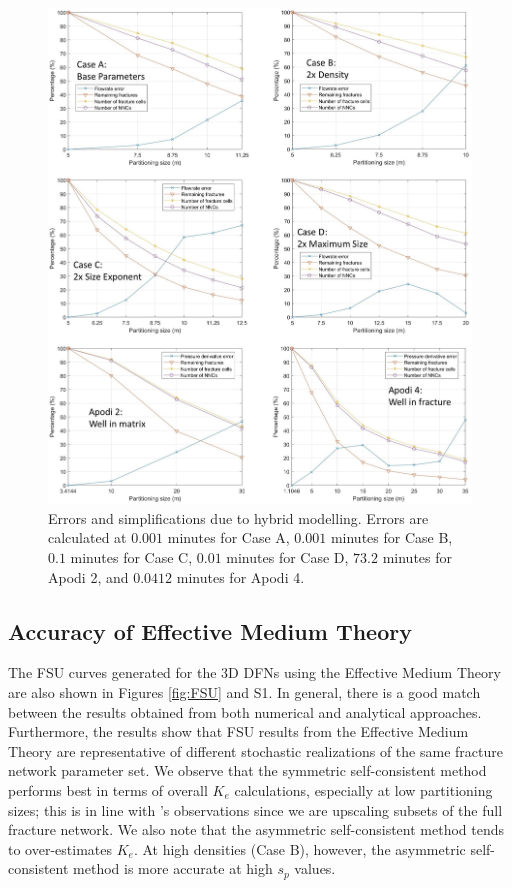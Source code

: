 \documentclass[draft]{agujournal2018}
\begin{document}
\begin{figure}[h]
	\centering
	
	\includegraphics[width=\textwidth]{Hybrid_Perf.jpg}
	
	\caption{Errors and simplifications due to hybrid modelling. Errors are calculated at $0.001$ minutes for Case A, $0.001$ minutes for Case B, $0.1$ minutes for Case C, $0.01$ minutes for Case D, $73.2$ minutes for Apodi 2, and $0.0412$ minutes for Apodi 4.}
	\label{fig:HP}
\end{figure}

\subsection{Accuracy of Effective Medium Theory}
The FSU curves generated for the 3D DFNs using the Effective Medium Theory are also shown in Figures \ref{fig:FSU} and S1. In general, there is a good match between the results obtained from both numerical and analytical approaches. Furthermore, the results show that FSU results from the Effective Medium Theory are representative of different stochastic realizations of the same fracture network parameter set. We observe that the symmetric self-consistent method performs best in terms of overall $K_e$ calculations, especially at low partitioning sizes; this is in line with \citet{Saevik2013}'s observations since we are upscaling subsets of the full fracture network. We also note that the asymmetric self-consistent method tends to over-estimates $K_e$. At high densities (Case B), however, the asymmetric self-consistent method is more accurate at high $s_p$ values.
\end{document}
